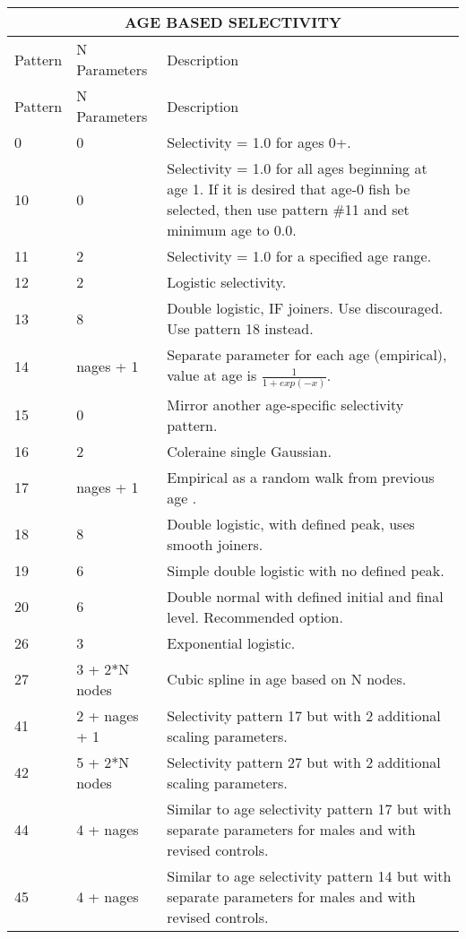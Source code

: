 \begin{longtable}{p{2cm} p{3cm} p{10cm}}
	\multicolumn{3}{c}{AGE BASED SELECTIVITY}\\
	\endfirsthead

	\hline
	Pattern & N Parameters & Description \Tstrut\Bstrut\\
	\hline
	\endhead

	\hline
	\endfoot
	\endlastfoot
	
	\hline
	Pattern & N Parameters & Description  \Tstrut\Bstrut\\
	\hline
	0  \Tstrut& 0 & Selectivity = 1.0 for ages 0+.\\
	10 \Tstrut& 0 & Selectivity = 1.0 for all ages beginning at age 1.  If it is desired that age-0 fish be selected, then use pattern \#11 and set minimum age to 0.0. \\
	11 \Tstrut& 2 & Selectivity = 1.0 for a specified age range.\\
	12 \Tstrut& 2 & Logistic selectivity.\\
	13 \Tstrut& 8 & Double logistic, IF joiners.  Use discouraged.  Use pattern 18 instead.\\
	14 \Tstrut& nages + 1 & Separate parameter for each age (empirical), value at age is $\frac{1}{1+exp(-x)}$. \\
	15 \Tstrut& 0 & Mirror another age-specific selectivity pattern.\\
	16 \Tstrut& 2 & Coleraine single Gaussian.\\
	17 \Tstrut& nages + 1 & Empirical as a random walk from previous age . \\
	18 \Tstrut& 8 & Double logistic, with defined peak, uses smooth joiners.  \\
	19 \Tstrut& 6 & Simple double logistic with no defined peak.\\
	20 \Tstrut& 6 & Double normal with defined initial and final level.  Recommended option. \\
	26 \Tstrut& 3 & Exponential logistic.\\
	27 \Tstrut& 3 + 2*N nodes & Cubic spline in age based on N nodes.\\
	41 \Tstrut& 2 + nages + 1 & Selectivity pattern 17 but with 2 additional scaling parameters. \\
	42 \Tstrut& 5 + 2*N nodes & Selectivity pattern 27 but with 2 additional scaling parameters. \\
	44 \Tstrut& 4 + nages & Similar to age selectivity pattern 17 but with separate parameters for males and with revised controls. \\
	45 \Tstrut& 4 + nages & Similar to age selectivity pattern 14 but with separate parameters for males and with revised controls.\Bstrut\\
	\hline
\end{longtable}

